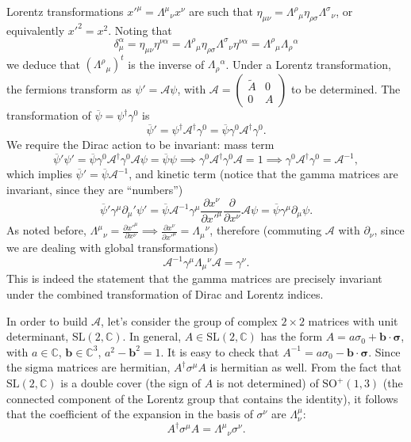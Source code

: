 \documentclass[a4paper,12pt]{book}
\renewcommand{\vec}{\mathbf}
\theoremstyle{definition}
\theoremstyle{remark}
\let\oldcdot\cdot
\renewcommand{\cdot}{\! \oldcdot \!}
\begin{document}
Lorentz transformations $x'^\mu=\Lambda^\mu{}_\nu x^\nu$ are such that $\eta_{\mu\nu}=\Lambda^\rho{}_\mu\eta_{\rho\sigma}\Lambda^\sigma{}_\nu$, or equivalently $x'^2=x^2$. Noting that
\[\delta_\mu^\alpha=\eta_{\mu\nu}\eta^{\nu\alpha}=\Lambda^\rho{}_\mu\eta_{\rho\sigma}\Lambda^\sigma{}_\nu\eta^{\nu\alpha}=\Lambda^\rho{}_\mu\Lambda_\rho{}^\alpha\]
we deduce that $(\Lambda^\rho{}_\mu)^t$ is the inverse of $\Lambda_\rho{}^\alpha$. Under a Lorentz transformation, the fermions transform as $\psi'=\mathcal A\psi$, with $\mathcal A=\begin{pmatrix}\tilde A& 0\\ 0& A\end{pmatrix}$ to be determined. The transformation of $\overline\psi=\psi^\dagger\gamma^0$ is
\[\overline\psi'=\psi^\dagger \mathcal A^\dagger\gamma^0=\overline\psi\gamma^0\mathcal A^\dagger\gamma^0.\]
We require the Dirac action to be invariant: mass term
\begin{equation}
\overline\psi'\psi'=\overline\psi\gamma^0\mathcal A^\dagger\gamma^0\mathcal A\psi=\overline\psi\psi\implies\gamma^0\mathcal A^\dagger\gamma^0\mathcal A=1\implies\gamma^0\mathcal A^\dagger\gamma^0=\mathcal A^{-1},
\label{eqn:Agammazero}
\end{equation}
which implies $\overline\psi'=\overline\psi\mathcal A^{-1}$, and kinetic term (notice that the gamma matrices are invariant, since they are ``numbers'')
\[\overline\psi'\gamma^\mu\partial_\mu'\psi'=\overline\psi\mathcal A^{-1}\gamma^\mu\frac{\partial x^\nu}{\partial x'^\mu}\frac{\partial}{\partial x^\nu}\mathcal A\psi=\overline\psi\gamma^\mu\partial_\mu\psi.\]
As noted before, $\Lambda^\mu{}_\nu=\frac{\partial x'^\mu}{\partial x^\nu}\implies \frac{\partial x^\nu}{\partial x'^\mu}=\Lambda_\mu{}^\nu$, therefore (commuting $\mathcal A$ with $\partial_\nu$, since we are dealing with global transformations)
\begin{equation}
\mathcal A^{-1}\gamma^\mu\Lambda_\mu{}^\nu\mathcal A=\gamma^\nu.
\label{eqn:AgammaLambda}
\end{equation}
This is indeed the statement that the gamma matrices are precisely invariant under the combined transformation of Dirac and Lorentz indices.

In order to build $\mathcal A$, let's consider the group of complex $2\times2$ matrices with unit determinant, $\text{SL}(2,\mathbb C)$. In general, $A\in\text{SL}(2,\mathbb C)$ has the form $A=a\sigma_0+\vec b\cdot\boldsymbol\sigma$, with $a\in\mathbb C$, $\vec b\in\mathbb C^3$, $a^2-\vec b^2=1$. It is easy to check that $A^{-1}=a\sigma_0-\vec b\cdot\boldsymbol\sigma$. Since the sigma matrices are hermitian, $A^\dagger\sigma^\mu A$ is hermitian as well. From the fact that $\text{SL}(2,\mathbb C)$ is a double cover (the sign of $A$ is not determined) of $\text{SO}^+(1,3)$ (the connected component of the Lorentz group that contains the identity), it follows that the coefficient of the expansion in the basis of $\sigma^\nu$ are $\Lambda^\mu_\nu$:
\begin{equation}
A^\dagger\sigma^\mu A=\Lambda^\mu{}_\nu\sigma^\nu.
\label{eqn:ALambda}
\end{equation}
\end{document}
